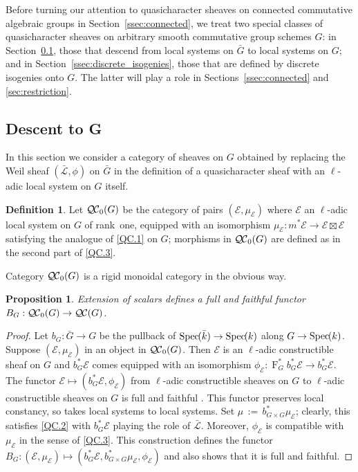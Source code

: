\documentclass{amsart}
\theoremstyle{plain}
\newtheorem{proposition}[theorem]{Proposition}
\theoremstyle{definition}
\newtheorem{definition}[theorem]{Definition}
\theoremstyle{remark}
\newcommand{\bFq}{\bar{k}}
\newcommand{\Fq}{k}
\newcommand{\Frob}[1]{\operatorname{F}_{#1}}
\newcommand{\Spec}[1]{{\operatorname{Spec}\hskip-1pt( #1 )}}
\newcommand{\ceq}{{\, :=\, }}
\newcommand{\qcs}[1]{{\mathcal{#1}}}
\newcommand{\gqcs}[1]{{\mathcal{\bar #1}}}
\newcommand{\QC}{{\mathcal{Q\hskip-0.8pt C}}}
\newcommand{\bQC}{{\QC_0}}
\newcommand{\bG}{\bar{G}}
\begin{document}
Before turning our attention to quasicharacter sheaves on connected commutative algebraic groups in Section~\ref{ssec:connected}, we treat two special classes of quasicharacter sheaves on arbitrary smooth commutative group schemes $G$:  in Section~\ref{ssec:descentG}, those that descend from local systems on $\bG$ to local systems on $G$; and in Section~\ref{ssec:discrete_isogenies}, those that are defined by discrete isogenies onto $G$. The latter will play a role in Sections~\ref{ssec:connected} and \ref{sec:restriction}.

\subsection{Descent to G}\label{ssec:descentG}

In this section we consider a category of sheaves on $G$ obtained by
replacing the Weil sheaf $(\gqcs{L}, \phi)$ on $\bG$ in the definition of a quasicharacter sheaf with an $\ell$-adic local system on $G$ itself.

\begin{definition}
Let $\bQC(G)$ be the category of pairs $(\qcs{E},\mu_\qcs{E})$
where $\qcs{E}$ an $\ell$-adic local system on $G$ of rank~one,
equipped with an isomorphism $\mu_\qcs{E} : m^* \qcs{E} \to \qcs{E} \boxtimes \qcs{E}$
satisfying the analogue of \ref{QC.1} on $G$;
morphisms in $\bQC(G)$ are defined as in the second part of
\ref{QC.3}.
\end{definition}

Category $\bQC(G)$ is a rigid monoidal category in the obvious way.

\begin{proposition}\label{prop:BG}
Extension of scalars defines a full and faithful functor $B_G : \bQC(G) \to \QC(G)$.
\end{proposition}

\begin{proof}
 Let $b_G : {\bar G} \to G$ be the pullback of $\Spec{\bFq} \to \Spec{\Fq}$ along $G\to \Spec{\Fq}$.
 Suppose $(\qcs{E},\mu_\qcs{E})$ in an object in $\bQC(G)$.
 Then $\qcs{E}$ is an $\ell$-adic constructible sheaf on $G$ and
 $b_G^* \qcs{E}$ comes equipped with an isomorphism
 $\phi_\qcs{E} : \Frob{G}^* b_G^*\qcs{E} \to b_G^* \qcs{E}$.
 The functor $\qcs{E} \mapsto (b_G^* \qcs{E},\phi_\qcs{E})$
 from $\ell$-adic constructible sheaves on $G$ to $\ell$-adic constructible sheaves on $G$
 is full and faithful .
 This functor preserves local constancy, so takes local systems to local systems.
 Set $\mu \ceq b_{G\times G}^*\mu_\qcs{E}$; clearly, this satisfies \ref{QC.2}
 with $b_G^*\qcs{E}$ playing the role of $\gqcs{L}$.
 Moreover, $\phi_\qcs{E}$ is compatible with $\mu_\qcs{E}$ in the sense of \ref{QC.3}.
 This construction defines the functor $B_G : (\qcs{E},\mu_\qcs{E}) \mapsto (b_G^*\qcs{E},b_{G\times G}^*\mu_\qcs{E}, \phi_\qcs{E})$
 and also shows that it is full and faithful.
\end{proof}
\end{document}
